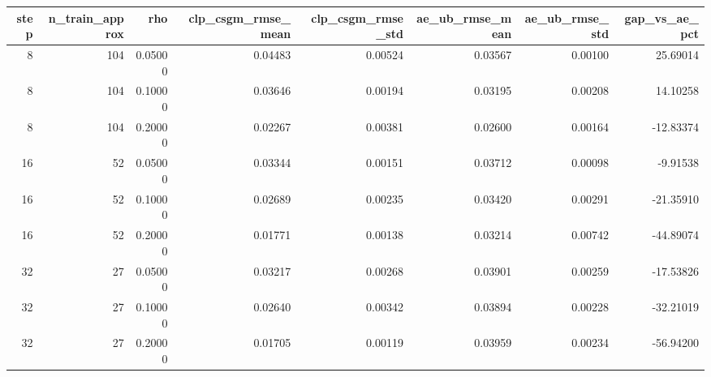 \begin{tabular}{rrrrrrrr}
\toprule
step & n\_train\_approx & rho & clp\_csgm\_rmse\_mean & clp\_csgm\_rmse\_std & ae\_ub\_rmse\_mean & ae\_ub\_rmse\_std & gap\_vs\_ae\_pct \\
\midrule
8 & 104 & 0.05000 & 0.04483 & 0.00524 & 0.03567 & 0.00100 & 25.69014 \\
8 & 104 & 0.10000 & 0.03646 & 0.00194 & 0.03195 & 0.00208 & 14.10258 \\
8 & 104 & 0.20000 & 0.02267 & 0.00381 & 0.02600 & 0.00164 & -12.83374 \\
16 & 52 & 0.05000 & 0.03344 & 0.00151 & 0.03712 & 0.00098 & -9.91538 \\
16 & 52 & 0.10000 & 0.02689 & 0.00235 & 0.03420 & 0.00291 & -21.35910 \\
16 & 52 & 0.20000 & 0.01771 & 0.00138 & 0.03214 & 0.00742 & -44.89074 \\
32 & 27 & 0.05000 & 0.03217 & 0.00268 & 0.03901 & 0.00259 & -17.53826 \\
32 & 27 & 0.10000 & 0.02640 & 0.00342 & 0.03894 & 0.00228 & -32.21019 \\
32 & 27 & 0.20000 & 0.01705 & 0.00119 & 0.03959 & 0.00234 & -56.94200 \\
\bottomrule
\end{tabular}
